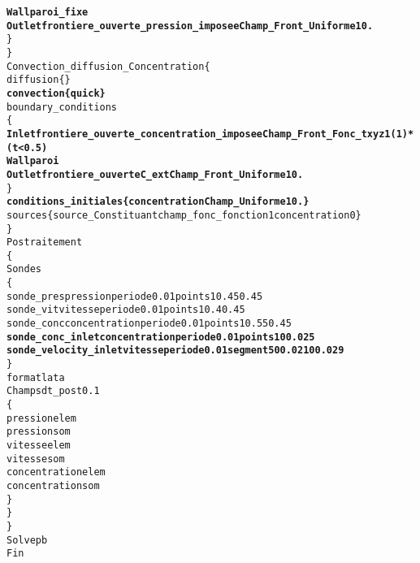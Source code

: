 \begin{alltt}
            {\bf{Wall    paroi_fixe}}
            {\bf{Outlet  frontiere_ouverte_pression_imposee Champ_Front_Uniforme 1 0.}}
        \}
    \}
    Convection_diffusion_Concentration \{
        diffusion \{ \}
        {\bf{convection \{ quick \} }}
        boundary_conditions 
        \{
            {\bf{Inlet   frontiere_ouverte_concentration_imposee Champ_Front_Fonc_txyz 1 (1)*(t<0.5)}}
            {\bf{Wall    paroi}}
            {\bf{Outlet  frontiere_ouverte C_ext Champ_Front_Uniforme 1 0.}}
        \}
        {\bf{conditions_initiales \{ concentration Champ_Uniforme 1 0. \} }}
        sources \{ source_Constituant champ_fonc_fonction 1 concentration 0 \}
    \}
    Postraitement
    \{
        Sondes
        \{
            sonde_pres pression periode 0.01 points 1 0.45 0.45
            sonde_vit vitesse periode 0.01 points 1 0.4 0.45
            sonde_conc concentration periode 0.01 points 1 0.55 0.45
            {\bf{sonde_conc_inlet concentration periode 0.01 points 1 0 0.025 }}
            {\bf{sonde_velocity_inlet vitesse periode 0.01 segment 5 0 0.021 0 0.029}}
        \}
        format lata
        Champs dt_post 0.1
        \{
            pression elem
            pression som
            vitesse elem
            vitesse som
            concentration elem
            concentration som
        \}
    \}
\}
Solve pb
Fin
\end{alltt}
